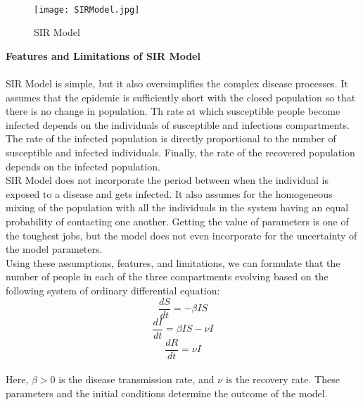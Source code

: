 \documentclass[11pt]{article}
\theoremstyle{definition}
\begin{document}
\\

\begin{figure}[htp]
\centering
    \texttt{[image: SIRModel.jpg]}
    \caption{SIR Model}
\end{figure}

{\textbf{\large Features and Limitations of SIR Model}}\\
\\
SIR Model is simple, but it also oversimplifies the complex disease processes. It assumes that the epidemic is sufficiently short with the closed population so that there is no change in population. Th rate at which susceptible people become infected depends on the individuals of susceptible and infectious compartments.  The rate of the infected population is directly proportional to the number of susceptible and infected individuals. Finally, the rate of the recovered population depends on the infected population.\\
SIR Model does not incorporate the period between when the individual is exposed to a disease and gets infected.  It also assumes for the homogeneous mixing of the population with all the individuals in the system having an equal probability of contacting one another. Getting the value of parameters is one of the toughest jobs, but the model does not even incorporate for the uncertainty of the model parameters.
\\
Using these assumptions, features, and limitations, we can formulate that the number of people in each of the three compartments evolving based on the following system of ordinary differential equation:
$$\frac{dS}{dt}=-\beta IS$$
$$\frac{dI}{dt}=\beta IS - \nu I$$
$$\frac{dR}{dt}=\nu I$$
\\
Here, $\beta>0$ is the disease transmission rate, and $\nu$ is the recovery rate. These parameters and the initial conditions determine the outcome of the model. 
\end{document}
